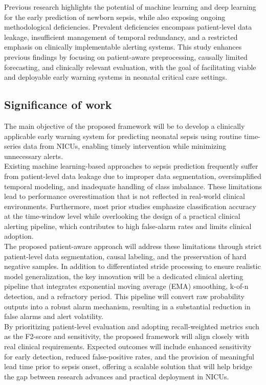 \documentclass[conference]{IEEEtran}
\begin{document}
Previous research highlights the potential of machine learning and deep learning for the early prediction of newborn sepsis, while also exposing ongoing methodological deficiencies. Prevalent deficiencies encompass patient-level data leakage, insufficient management of temporal redundancy, and a restricted emphasis on clinically implementable alerting systems. This study enhances previous findings by focusing on patient-aware preprocessing, causally limited forecasting, and clinically relevant evaluation, with the goal of facilitating viable and deployable early warning systems in neonatal critical care settings.

\subsection{Significance of work } 
The main objective of the proposed framework will be to develop a clinically applicable early warning system for predicting neonatal sepsis using routine time-series data from NICUs, enabling timely intervention while minimizing unnecessary alerts.\\

Existing machine learning-based approaches to sepsis prediction frequently suffer from patient-level data leakage due to improper data segmentation, oversimplified temporal modeling, and inadequate handling of class imbalance. These limitations lead to performance overestimation that is not reflected in real-world clinical environments. Furthermore, most prior studies emphasize classification accuracy at the time-window level while overlooking the design of a practical clinical alerting pipeline, which contributes to high false-alarm rates and limits clinical adoption.\\

The proposed patient-aware approach will address these limitations through strict patient-level data segmentation, causal labeling, and the preservation of hard negative samples. In addition to differentiated stride processing to ensure realistic model generalization, the key innovation will be a dedicated clinical alerting pipeline that integrates exponential moving average (EMA) smoothing, k-of-n detection, and a refractory period. This pipeline will convert raw probability outputs into a robust alarm mechanism, resulting in a substantial reduction in false alarms and alert volatility.\\

By prioritizing patient-level evaluation and adopting recall-weighted metrics such as the F2-score and sensitivity, the proposed framework will align closely with real clinical requirements. Expected outcomes will include enhanced sensitivity for early detection, reduced false-positive rates, and the provision of meaningful lead time prior to sepsis onset, offering a scalable solution that will help bridge the gap between research advances and practical deployment in NICUs.\\
\end{document}
